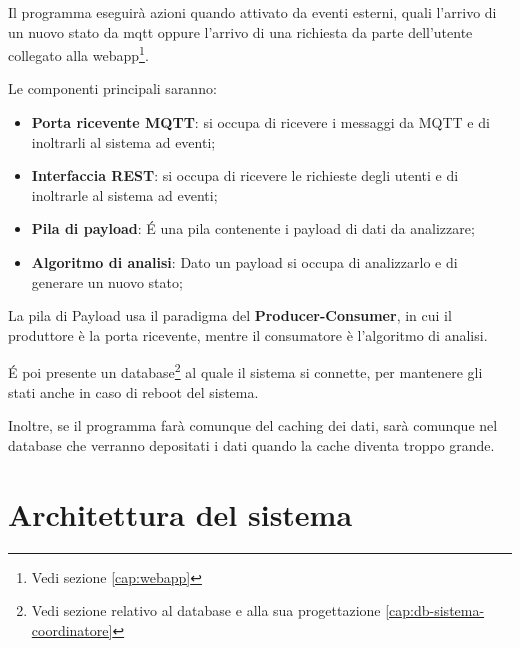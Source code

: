 Il programma eseguirà azioni quando attivato da eventi esterni, quali l'arrivo di un nuovo stato da mqtt oppure l'arrivo di una richiesta da parte dell'utente collegato alla webapp\footnote{Vedi sezione \ref{cap:webapp}}.

Le componenti principali saranno:

\begin{itemize}
    \item \textbf{Porta ricevente MQTT}: si occupa di ricevere i messaggi da MQTT e di inoltrarli al sistema ad eventi;
    \item \textbf{Interfaccia REST}: si occupa di ricevere le richieste degli utenti e di inoltrarle al sistema ad eventi;
    \item \textbf{Pila di payload}: É una pila contenente i payload di dati da analizzare;
    \item \textbf{Algoritmo di analisi}: Dato un payload si occupa di analizzarlo e di generare un nuovo stato;
\end{itemize}

La pila di Payload usa il paradigma del \textbf{Producer-Consumer}, in cui il produttore è la porta ricevente, mentre il consumatore è l'algoritmo di analisi.

É poi presente un database\footnote{Vedi sezione relativo al database e alla sua progettazione \ref{cap:db-sistema-coordinatore}} al quale il sistema si connette, per mantenere gli stati anche in caso di reboot del sistema.

Inoltre, se il programma farà comunque del caching dei dati, sarà comunque nel database che verranno depositati i dati quando la cache diventa troppo grande.

\section{Architettura del sistema}


